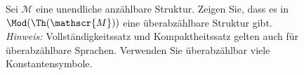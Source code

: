 
\begin{exercise}[130]

Sei $\mathscr{M}$ eine unendliche anzählbare Struktur. Zeigen Sie, dass es in
$\Mod(\Th(\mathscr{M}))$ eine überabzählbare Struktur gibt. \\
\textit{Hinweis:} Vollständigkeitssatz und Kompaktheitssatz gelten auch für
überabzählbare Sprachen. Verwenden Sie überabzählbar viele Konstantensymbole.

\end{exercise}


\begin{solution}

\phantom{}

\end{solution}

